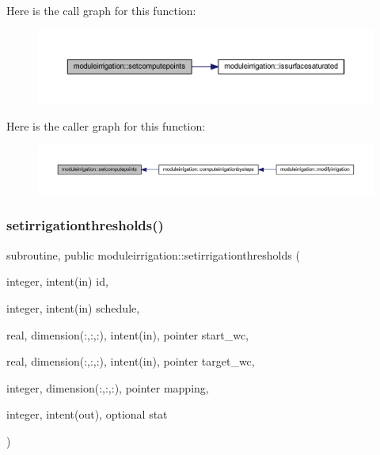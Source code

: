 Here is the call graph for this function\+:\nopagebreak
\begin{figure}[H]
\begin{center}
\leavevmode
\includegraphics[width=350pt]{namespacemoduleirrigation_a3c849d3ae9b8a9b5488e452d7fb9490e_cgraph}
\end{center}
\end{figure}
Here is the caller graph for this function\+:\nopagebreak
\begin{figure}[H]
\begin{center}
\leavevmode
\includegraphics[width=350pt]{namespacemoduleirrigation_a3c849d3ae9b8a9b5488e452d7fb9490e_icgraph}
\end{center}
\end{figure}
\mbox{\label{namespacemoduleirrigation_a7a8a56e2b5c74ba0280ecb4abe6cc726}} 
\subsubsection{\texorpdfstring{setirrigationthresholds()}{setirrigationthresholds()}}
{\footnotesize\ttfamily subroutine, public moduleirrigation\+::setirrigationthresholds (\begin{DoxyParamCaption}\item[{integer, intent(in)}]{id,  }\item[{integer, intent(in)}]{schedule,  }\item[{real, dimension(\+:,\+:,\+:), intent(in), pointer}]{start\+\_\+wc,  }\item[{real, dimension(\+:,\+:,\+:), intent(in), pointer}]{target\+\_\+wc,  }\item[{integer, dimension(\+:,\+:,\+:), pointer}]{mapping,  }\item[{integer, intent(out), optional}]{stat }\end{DoxyParamCaption})}

